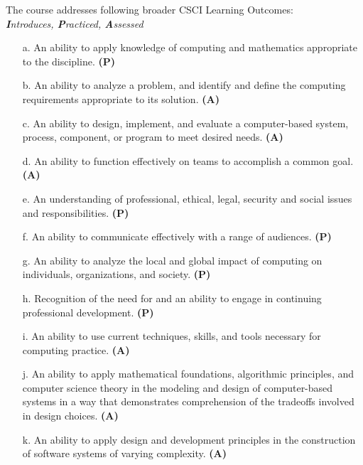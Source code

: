 \documentclass[12pt]{article}
\begin{document}
  The course addresses following broader CSCI Learning Outcomes: \\
  \textit{\textbf{I}ntroduces, \textbf{P}racticed, \textbf{A}ssessed} \\
  \begin{itemize}
    \item[a.] An ability to apply knowledge of computing and mathematics appropriate to the discipline. \textbf{(P)}
    \item[b.]  An ability to analyze a problem, and identify and define the computing requirements appropriate to its solution. \textbf{(A)}
    \item[c.] An ability to design, implement, and evaluate a computer-based system, process, component, or program to meet desired needs. \textbf{(A)}
    \item[d.] An ability to function effectively on teams to accomplish a common goal. \textbf{(A)}
    \item[e.] An understanding of professional, ethical, legal, security and social issues and responsibilities. \textbf{(P)}
    \item[f.] An ability to communicate effectively with a range of audiences. \textbf{(P)}
    \item[g.] An ability to analyze the local and global impact of computing on individuals, organizations, and society. \textbf{(P)}
    \item[h.] Recognition of the need for and an ability to engage in continuing professional development. \textbf{(P)}
    \item[i.] An ability to use current techniques, skills, and tools necessary for computing practice. \textbf{(A)}
    \item[j.] An ability to apply mathematical foundations, algorithmic principles, and computer science theory in the modeling and design of computer-based systems in a way that demonstrates comprehension of the tradeoffs involved in design choices. \textbf{(A)} 
    \item[k.] An ability to apply design and development principles in the construction of software systems of varying complexity. \textbf{(A)}
  \end{itemize}
\end{document}
